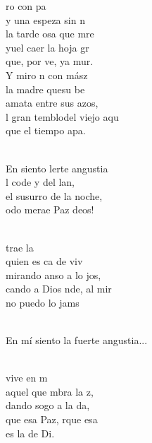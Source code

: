 \begin{cancion}%
	ro con pa \\
	y una espeza sin n  \\
	la tarde osa que mre\\
	yuel caer  la hoja gr\\
	que, por ve, ya mur.\\
	Y miro n con mász\\
	la madre quesu be  \\
	amata entre sus azos,\\
	l gran temblodel viejo aqu\\
	que el tiempo apa. \\\jump\\
	\begin{chorus}%
	En siento lerte angustia\\
	l code y del lan, \\
	el susurro de la noche,\\
	odo merae Paz deos!\\
	\end{chorus}%
	\jump\\
	 trae la  \\
	quien es ca de viv  \\
	mirando anso a lo jos,\\
	cando a Dios nde, al mir\\
	no puedo lo jams\\\jump\\
	\begin{chorus}%
En mí siento la fuerte angustia...\\
	\end{chorus}%
	\jump\\
	vive en m \\
	aquel que mbra la z,  \\
	dando sogo a la da,\\
	que esa Paz, rque esa \\
	es la  de Di.\\
\end{cancion}%

